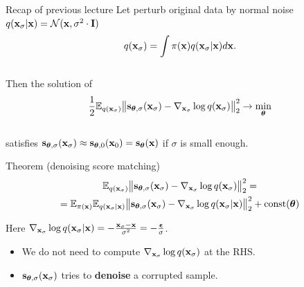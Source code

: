 

\usepackage{tikz}

\usetikzlibrary{arrows,shapes,positioning,shadows,trees}

\begin{frame}
\titlepage
\end{frame}
\begin{frame}{Recap of previous lecture}
	Let perturb original data by normal noise $q(\mathbf{x}_{\sigma} | \mathbf{x}) = \mathcal{N}(\mathbf{x}, \sigma^2 \cdot \mathbf{I})$
	\vspace{-0.3cm}
	\[
	q(\mathbf{x}_{\sigma}) = \int \pi(\mathbf{x}) q(\mathbf{x}_{\sigma} | \mathbf{x}) d\mathbf{x}.
	\]
	\vspace{-0.6cm} \\
	Then the solution of 
	\vspace{-0.2cm}
	\[
	\frac{1}{2} \mathbb{E}_{q(\mathbf{x}_{\sigma})}\bigl\| \mathbf{s}_{\boldsymbol{\theta}, \sigma}(\mathbf{x}_{\sigma}) - \nabla_{\mathbf{x}_{\sigma}} \log q(\mathbf{x}_{\sigma}) \bigr\|^2_2 \rightarrow \min_{\boldsymbol{\theta}}
	\]
	\vspace{-0.5cm} \\
	satisfies $\mathbf{s}_{\boldsymbol{\theta}, \sigma}(\mathbf{x}_{\sigma}) \approx \mathbf{s}_{\boldsymbol{\theta}, 0}(\mathbf{x}_0) = \mathbf{s}_{\boldsymbol{\theta}}(\mathbf{x})$ if $\sigma$ is small enough.
	\begin{block}{Theorem (denoising score matching)}
		\vspace{-0.8cm}
		\begin{multline*}
			\mathbb{E}_{q(\mathbf{x}_{\sigma})}\bigl\| \mathbf{s}_{\boldsymbol{\theta}, \sigma}(\mathbf{x}_{\sigma}) - \nabla_{\mathbf{x}_{\sigma}} \log q(\mathbf{x}_{\sigma}) \bigr\|^2_2 = \\ = \mathbb{E}_{\pi(\mathbf{x})} \mathbb{E}_{q(\mathbf{x}_{\sigma} | \mathbf{x})}\bigl\| \mathbf{s}_{\boldsymbol{\theta}, \sigma}(\mathbf{x}_{\sigma}) - \nabla_{\mathbf{x}_{\sigma}} \log q(\mathbf{x}_{\sigma} | \mathbf{x}) \bigr\|^2_2 + \text{const}(\boldsymbol{\theta})
		\end{multline*}
		\vspace{-0.7cm}
	\end{block}
	Here $\nabla_{\mathbf{x}_{\sigma}} \log q(\mathbf{x}_{\sigma} | \mathbf{x}) = - \frac{\mathbf{x}_{\sigma} - \mathbf{x}}{\sigma^2} = - \frac{\boldsymbol{\epsilon}}{\sigma}$.
	\begin{itemize}
		\item We do not need to compute $\nabla_{\mathbf{x}_{\sigma}} \log q(\mathbf{x}_{\sigma})$ at the RHS.
		\item $\mathbf{s}_{\boldsymbol{\theta}, \sigma}(\mathbf{x}_{\sigma})$ tries to \textbf{denoise} a corrupted sample.
	\end{itemize}
\end{frame}
